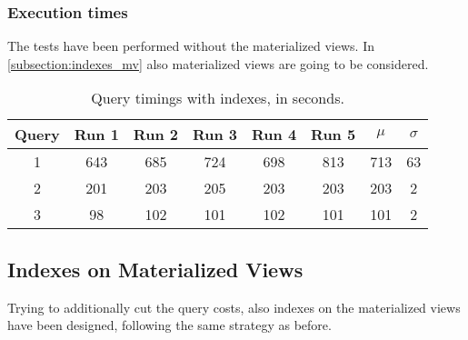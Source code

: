 \subsubsection{Execution times}

The tests have been performed without the materialized views. In \autoref{subsection:indexes_mv} also materialized views are going to be considered.

\begin{table}[!h]
\centering
\begin{tabular}{|| c | c c c c c | c c ||} 
 \hline
 Query & Run 1 & Run 2 & Run 3 & Run 4 & Run 5 & 	$\mu$ & $\sigma$ \\ [0.5ex] 
 \hline\hline
 1 & 643 & 685 & 724 & 698 & 813 & 713 & 63 \\ 
 \hline
 2 & 201 & 203 & 205 & 203 & 203 & 203 & 2 \\
 \hline
 3 & 98 & 102 & 101 & 102 & 101 & 101 & 2 \\
 \hline
\end{tabular}
  \caption{Query timings with indexes, in seconds.}
  \label{tab:materializationstimings}
\end{table}

\subsection{Indexes on Materialized Views}\label{subsection:indexes_mv}
Trying to additionally cut the query costs, also indexes on the materialized views have been designed, following the same strategy as before.


